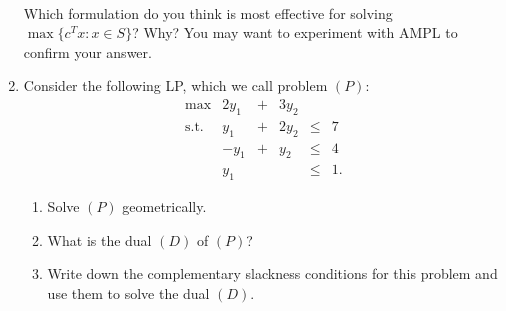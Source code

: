 \documentclass[12pt]{article}
\newcommand{\real}{I\!\! R}
\newcommand{\binary}{I\!\! B}
\begin{document}
\begin{enumerate}
\begin{eqnarray*}
\end{eqnarray*}
Which formulation do you think is most effective for solving
$\max\{c^Tx: x\in S\}$? Why?
You may want to experiment with AMPL to confirm your answer.
  \item  Consider the following LP, which we call problem $(P)$:
         \begin{displaymath}
          \begin{array}{lrcrcc}
           \max         &  2y_1 & + & 3y_2 &      &     \\
           \mbox{s.t.}  &  y_1 & + &  2y_2 & \leq & 7   \\
                        & -y_1 & + &  y_2 & \leq & 4   \\
                        &  y_1    &   &  & \leq & 1.
          \end{array}
         \end{displaymath}
         \begin{enumerate}
           \item  Solve $(P)$ geometrically.
           \item  What is the dual $(D)$ of $(P)$?
           \item  Write down the complementary slackness conditions for
                  this problem and use them to solve the dual $(D)$.

\end{enumerate}
\end{enumerate}
\end{document}
